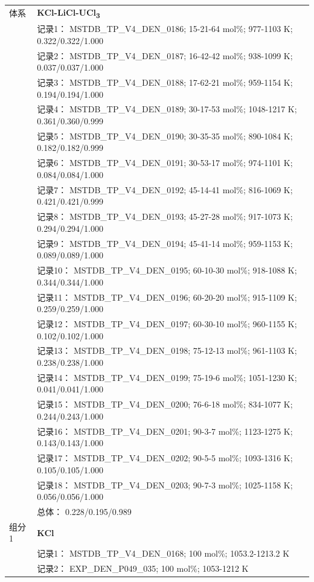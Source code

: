 \documentclass[12pt]{article}
\begin{document}
{\begin{longtable}[]{@{}
  >{\raggedright\arraybackslash}p{}
  >{\raggedright\arraybackslash}p{}@{}}
\midrule
体系 & \textbf{KCl-LiCl-UCl\textsubscript{3}} \\
 & 记录1： MSTDB\_TP\_V4\_DEN\_0186; 15-21-64 mol\%; 977-1103 K; 0.322/0.322/1.000 \\
 & 记录2： MSTDB\_TP\_V4\_DEN\_0187; 16-42-42 mol\%; 938-1099 K; 0.037/0.037/1.000 \\
 & 记录3： MSTDB\_TP\_V4\_DEN\_0188; 17-62-21 mol\%; 959-1154 K; 0.194/0.194/1.000 \\
 & 记录4： MSTDB\_TP\_V4\_DEN\_0189; 30-17-53 mol\%; 1048-1217 K; 0.361/0.360/0.999 \\
 & 记录5： MSTDB\_TP\_V4\_DEN\_0190; 30-35-35 mol\%; 890-1084 K; 0.182/0.182/0.999 \\
 & 记录6： MSTDB\_TP\_V4\_DEN\_0191; 30-53-17 mol\%; 974-1101 K; 0.084/0.084/1.000 \\
 & 记录7： MSTDB\_TP\_V4\_DEN\_0192; 45-14-41 mol\%; 816-1069 K; 0.421/0.421/0.999 \\
 & 记录8： MSTDB\_TP\_V4\_DEN\_0193; 45-27-28 mol\%; 917-1073 K; 0.294/0.294/1.000 \\
 & 记录9： MSTDB\_TP\_V4\_DEN\_0194; 45-41-14 mol\%; 959-1153 K; 0.089/0.089/1.000 \\
 & 记录10： MSTDB\_TP\_V4\_DEN\_0195; 60-10-30 mol\%; 918-1088 K; 0.344/0.344/1.000 \\
 & 记录11： MSTDB\_TP\_V4\_DEN\_0196; 60-20-20 mol\%; 915-1109 K; 0.259/0.259/1.000 \\
 & 记录12： MSTDB\_TP\_V4\_DEN\_0197; 60-30-10 mol\%; 960-1155 K; 0.102/0.102/1.000 \\
 & 记录13： MSTDB\_TP\_V4\_DEN\_0198; 75-12-13 mol\%; 961-1103 K; 0.238/0.238/1.000 \\
 & 记录14： MSTDB\_TP\_V4\_DEN\_0199; 75-19-6 mol\%; 1051-1230 K; 0.041/0.041/1.000 \\
 & 记录15： MSTDB\_TP\_V4\_DEN\_0200; 76-6-18 mol\%; 834-1077 K; 0.244/0.243/1.000 \\
 & 记录16： MSTDB\_TP\_V4\_DEN\_0201; 90-3-7 mol\%; 1123-1275 K; 0.143/0.143/1.000 \\
 & 记录17： MSTDB\_TP\_V4\_DEN\_0202; 90-5-5 mol\%; 1093-1316 K; 0.105/0.105/1.000 \\
 & 记录18： MSTDB\_TP\_V4\_DEN\_0203; 90-7-3 mol\%; 1025-1158 K; 0.056/0.056/1.000 \\
 & 总体： 0.228/0.195/0.989  \\

组分 1  & \textbf{KCl} \\
 & 记录1： MSTDB\_TP\_V4\_DEN\_0168; 100 mol\%; 1053.2-1213.2 K \\
 & 记录2： EXP\_DEN\_P049\_035; 100 mol\%; 1053-1212 K  \\


\end{longtable}}
\end{document}
